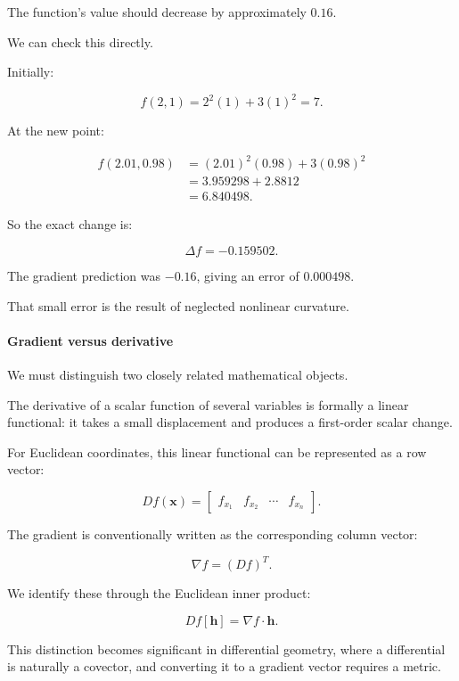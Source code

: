 The function's value should decrease by approximately \(0.16\).

We can check this directly.

Initially:

\[
f(2,1)=2^2(1)+3(1)^2=7.
\]

At the new point:

\[
\begin{aligned} f(2.01,0.98) &=(2.01)^2(0.98)+3(0.98)^2\\ &=3.959298+2.8812\\ &=6.840498. \end{aligned}
\]

So the exact change is:

\[
\Delta f=-0.159502.
\]

The gradient prediction was \(-0.16\), giving an error of \(0.000498\).

That small error is the result of neglected nonlinear curvature.

\paragraph{Gradient versus derivative}\label{02-foundations-ii-ch021-gradient-versus-derivative}

\hypertarget{02-foundations-ii-ch021-gradient-versus-derivative}{}

We must distinguish two closely related mathematical objects.

The derivative of a scalar function of several variables is formally a linear functional: it takes a small displacement and produces a first-order scalar change.

For Euclidean coordinates, this linear functional can be represented as a row vector:

\[
Df(\mathbf x)= \begin{bmatrix} f_{x_1}&f_{x_2}&\cdots&f_{x_n} \end{bmatrix}.
\]

The gradient is conventionally written as the corresponding column vector:

\[
\nabla f=(Df)^T.
\]

We identify these through the Euclidean inner product:

\[
Df[\mathbf h]=\nabla f\cdot\mathbf h.
\]

This distinction becomes significant in differential geometry, where a differential is naturally a covector, and converting it to a gradient vector requires a metric.

